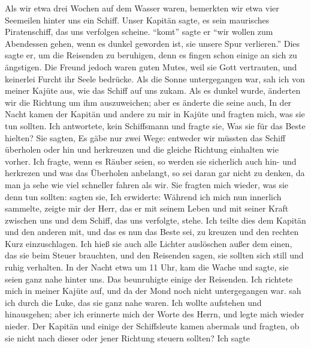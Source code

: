 Als wir etwa drei Wochen auf dem Wasser waren, bemerkten
wir etwa vier Seemeilen hinter uns ein Schiff. Unser Kapitän
sagte, es sein maurisches Piratenschiff, das uns verfolgen
scheine. "`komt"' sagte er "`wir wollen zum Abendessen gehen,
wenn es dunkel geworden ist, sie unsere Spur verlieren."'
Dies sagte er, um die Reisenden zu beruhigen, denn es fingen
schon einige an sich zu ängstigen. Die Freund jedoch waren
guten Mutes, weil sie Gott vertrauten, und keinerlei Furcht ihr
Seele bedrücke. Als die Sonne untergegangen war, sah ich von
meiner Kajüte aus, wie das Schiff auf uns zukam. Als es
dunkel wurde, änderten wir die Richtung um ihm auszuweichen;
aber es änderte die seine auch, In der Nacht
kamen der Kapitän und andere zu mir in Kajüte und fragten
mich, was sie tun sollten. Ich antwortete,  kein Schiffsmann
und fragte sie, Was sie für das Beste hielten? Sie sagten,
Es gäbe nur zwei Wege: entweder wir müssten das Schiff überholen
oder hin und herkreuzen und die gleiche Richtung einhalten
wie vorher. Ich fragte, wenn es Räuber seien, so werden sie
sicherlich auch hin- und herkrezen und was das Überholen anbelangt,
so sei daran gar nicht zu denken, da man ja sehe wie
viel schneller fahren als wir. Sie fragten mich wieder, was
sie denn tun sollten:  sagten sie,  Ich erwiderte:  Während ich mich nun innerlich sammelte, zeigte
mir der Herr, das er mit seinem Leben und mit seiner Kraft
zwischen uns und dem Schiff, das uns verfolgte, stehe. Ich
teilte dies dem Kapitän und den anderen mit, und das es nun
das Beste sei, zu kreuzen und den rechten Kurz einzuschlagen.
Ich hieß sie auch alle Lichter auslöschen außer dem einen, das
sie beim Steuer brauchten, und den Reisenden sagen, sie sollten
sich still und ruhig verhalten. In der Nacht etwa um 11 Uhr,
kam die Wache und sagte, sie seien ganz nahe hinter uns. Das
beunruhigte einige der Reisenden. Ich richtete mich in meiner
Kajüte auf, und da der Mond noch nicht untergegangen war. sah
ich durch die Luke, das sie ganz nahe waren. Ich wollte aufstehen 
und hinausgehen; aber ich erinnerte mich der Worte des
Herrn,  und legte mich wieder nieder. Der Kapitän
und einige der Schiffsleute kamen abermals und fragten, ob sie
nicht nach dieser oder jener Richtung steuern sollten? Ich sagte
